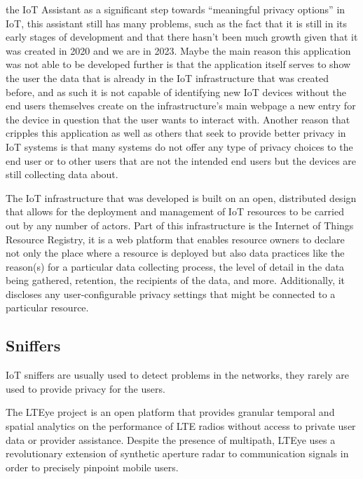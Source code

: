 the IoT Assistant as a significant step towards ``meaningful privacy options''
in IoT, this assistant still has many problems, such as the fact that it
is still in its early stages of development and that there hasn't been much
growth given that it was created in 2020 and we are in 2023. Maybe the main
reason this application was not able to be developed further is that the
application itself serves to show the user the data that is already in the
IoT infrastructure that was created before, and as such it is not capable
of identifying new IoT devices without the end users themselves create on
the infrastructure's main webpage \cite{DasPersonalized} a new entry for
the device in question that the user wants to interact with. Another reason
that cripples this application as well as others that seek to provide better
privacy in IoT systems is that many systems do not offer any type of privacy
choices to the end user or to other users that are not the intended end
users but the devices are still collecting data about.

The IoT infrastructure that was developed \cite{DasPersonalized} is built
on an open, distributed design that allows for the deployment and management
of IoT resources to be carried out by any number of actors. Part of this
infrastructure is the Internet of Things Resource Registry, it is a web
platform that enables resource owners to declare not only the place where
a resource is deployed but also data practices like the reason(s) for a
particular data collecting process, the level of detail in the data being
gathered, retention, the recipients of the data, and more. Additionally,
it discloses any user-configurable privacy settings that might be connected
to a particular resource.

\subsection{Sniffers}

IoT sniffers are usually used to detect problems in the networks, they rarely
are used to provide privacy for the users.

The LTEye project \cite{KumarLTE} is an open platform that provides granular
temporal and spatial analytics on the performance of LTE radios without access
to private user data or provider assistance. Despite the presence of multipath,
LTEye uses a revolutionary extension of synthetic aperture radar to communication
signals in order to precisely pinpoint mobile users.

